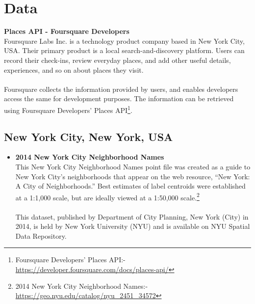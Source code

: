 \documentclass{article}
\begin{document}
\section{Data}
\textbf{Places API - Foursquare Developers}\\{Foursquare Labs Inc. is a technology product company based in New York City, USA. Their primary product is a local search-and-discovery platform. Users can record their check-ins, review everyday places, and add other useful details, experiences, and so on about places they visit.}\\\\{Foursquare collects the information provided by users, and enables developers access the same for development purposes. The information can be retrieved using Foursquare Developers' Places API\footnote{Foursquare Developers' Places API:- \url{https://developer.foursquare.com/docs/places-api/}}.}
\subsection{New York City, New York, USA}
\begin{itemize}
    \item \textbf{2014 New York City Neighborhood Names}\\{This New York City Neighborhood Names point file was created as a guide to New York City’s neighborhoods that appear on the web resource, “New York: A City of Neighborhoods.” Best estimates of label centroids were established at a 1:1,000 scale, but are ideally viewed at a 1:50,000 scale.\footnote{2014 New York City Neighborhood Names:- \url{https://geo.nyu.edu/catalog/nyu\_2451\_34572}}}\\\\{This dataset, published by Department of City Planning, New York (City) in 2014, is held by New York University (NYU) and is available on NYU Spatial Data Repository.}
\end{itemize}
\pagebreak
\end{document}
